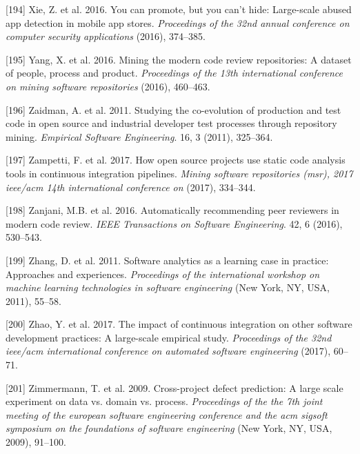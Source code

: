 \documentclass[]{book}
\begin{document}
\hypertarget{ref-xie2016you}{}
{[}194{]} Xie, Z. et al. 2016. You can promote, but you can't hide:
Large-scale abused app detection in mobile app stores. \emph{Proceedings
of the 32nd annual conference on computer security applications} (2016),
374--385.

\hypertarget{ref-yang2016mining}{}
{[}195{]} Yang, X. et al. 2016. Mining the modern code review
repositories: A dataset of people, process and product.
\emph{Proceedings of the 13th international conference on mining
software repositories} (2016), 460--463.

\hypertarget{ref-zaidman2011studying}{}
{[}196{]} Zaidman, A. et al. 2011. Studying the co-evolution of
production and test code in open source and industrial developer test
processes through repository mining. \emph{Empirical Software
Engineering}. 16, 3 (2011), 325--364.

\hypertarget{ref-zampetti2017open}{}
{[}197{]} Zampetti, F. et al. 2017. How open source projects use static
code analysis tools in continuous integration pipelines. \emph{Mining
software repositories (msr), 2017 ieee/acm 14th international conference
on} (2017), 334--344.

\hypertarget{ref-zanjani2016automatically}{}
{[}198{]} Zanjani, M.B. et al. 2016. Automatically recommending peer
reviewers in modern code review. \emph{IEEE Transactions on Software
Engineering}. 42, 6 (2016), 530--543.

\hypertarget{ref-Zhang11}{}
{[}199{]} Zhang, D. et al. 2011. Software analytics as a learning case
in practice: Approaches and experiences. \emph{Proceedings of the
international workshop on machine learning technologies in software
engineering} (New York, NY, USA, 2011), 55--58.

\hypertarget{ref-zhao2017impact}{}
{[}200{]} Zhao, Y. et al. 2017. The impact of continuous integration on
other software development practices: A large-scale empirical study.
\emph{Proceedings of the 32nd ieee/acm international conference on
automated software engineering} (2017), 60--71.

\hypertarget{ref-zimmermann2009}{}
{[}201{]} Zimmermann, T. et al. 2009. Cross-project defect prediction: A
large scale experiment on data vs. domain vs. process. \emph{Proceedings
of the the 7th joint meeting of the european software engineering
conference and the acm sigsoft symposium on the foundations of software
engineering} (New York, NY, USA, 2009), 91--100.
\end{document}
